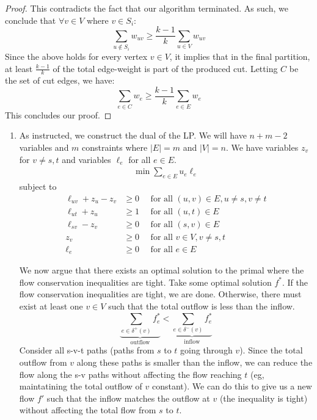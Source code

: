 \documentclass[12pt]{exam}
\newcommand{\Q}[1]{\question{\large{\textbf{#1}}}}
\begin{document}
\begin{questions}
\begin{solution}
\begin{proof}
      This contradicts the fact that our algorithm terminated. As such, we conclude that $\forall v \in V$ where $v \in S_i$:
      \[
        \sum_{u \notin S_i} w_{uv} \geq \frac{k-1}{k} \sum_{u \in V} w_{uv}
      \] 
      Since the above holds for every vertex $v \in V$, it implies that in the final partition, at least $\frac{k-1}{k}$ of the total edge-weight is part of the produced cut. Letting $C$ be the set of cut edges, we have:
      \[
        \sum_{e \in C} w_e \geq \frac{k-1}{k} \sum_{e \in E} w_{e}
      \]
      This concludes our proof.
    \end{proof}
\end{solution}

\newpage
\Q{Problem 23}
\begin{solution}
  \begin{enumerate}[label=(\alph*)]
    \item As instructed, we construct the dual of the LP. We will have $n + m - 2$ variables and $m$ constraints where $|E| = m$ and $|V| = n$. We have variables $z_v$ for $v \neq s,t$ and variables $\ell_e$ for all $e \in E$.
    \begin{align}
      \min \sum_{e \in E} u_e \ell_e
    \end{align}
    subject to
    \begin{align}
      \ell_{uv} + z_u - z_v &\geq 0 \quad \text{ for all } (u,v) \in E, u \neq s, v \neq t \label{flow_inquality} \\
      \ell_{ut} + z_u &\geq 1 \quad \text{ for all } (u,t) \in E \label{flow_inquality_2}\\
      \ell_{sv} - z_v &\geq 0 \quad \text{ for all } (s,v) \in E \label{flow_inquality_3}\\
      z_v &\geq 0 \quad \text{ for all } v \in V, v \neq s,t \\
      \ell_e &\geq 0 \quad \text{ for all } e \in E
    \end{align}

  We now argue that there exists an optimal solution to the primal where the flow conservation inequalities are tight. Take some optimal solution $f^*$. If the flow conservation inequalities are tight, we are done. Otherwise, there must exist at least one $v \in V$ such that the total outflow is less than the inflow.
  \[
    \underbrace{\sum_{e \in \delta^+(v)} f_e^*}_{\text{outflow}} < \underbrace{\sum_{e \in \delta^-(v)} f_e^*}_{\text{inflow}}
  \]
  Consider all s-v-t paths (paths from $s$ to $t$ going through $v$). Since the total outflow from $v$ along these paths is smaller than the inflow, we can reduce the flow along the s-v paths without affecting the flow reaching $t$ (eg, maintatining the total outflow of $v$ constant). We can do this to give us a new flow $f'$ such that the inflow matches the outflow at $v$ (the inequality is tight) without affecting the total flow from $s$ to $t$.


\end{enumerate}
\end{solution}
\end{questions}
\end{document}
